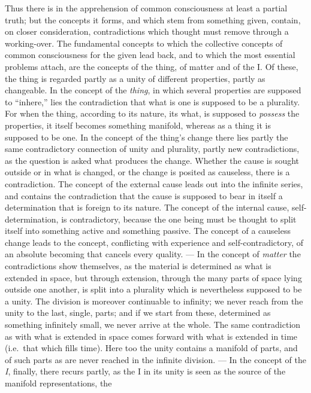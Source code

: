 Thus there is in the apprehension of common consciousness at least a
partial truth; but the concepts it forms, and which stem from something
given, contain, on closer consideration, contradictions which thought
must remove through a working-over. The fundamental concepts to which
the collective concepts of common consciousness for the given lead back,
and to which the most essential problems attach, are the concepts of the
thing, of matter and of the I. Of these, the thing is regarded
partly as a unity of different properties, partly as
changeable. In the concept of the \emph{thing}, in which several
properties are supposed to ``inhere,'' lies the contradiction that what
is one is supposed to be a plurality. For when the thing, according to
its nature, its what, is supposed to \emph{possess} the properties, it
itself becomes something manifold, whereas as a thing it is supposed to
be one. In the concept of the thing's change there lies partly the same
contradictory connection of unity and plurality, partly new
contradictions, as the question is asked what produces the change.
Whether the cause is sought outside or in what is changed, or the change
is posited as causeless, there is a contradiction. The concept of the
external cause leads out into the infinite series, and contains the
contradiction that the cause is supposed to bear in itself a
determination that is foreign to its nature. The concept of the internal
cause, self-determination, is contradictory, because the one being must
be thought to split itself into something active and something passive.
The concept of a causeless change leads to the concept, conflicting with
experience and self-contradictory, of an absolute becoming that cancels
every quality. --- In the concept of \emph{matter} the contradictions
show themselves, as the material is determined as what is extended in
space, but through extension, through the many parts of space lying
outside one another, is split into a plurality which is nevertheless
supposed to be a unity. The division is moreover continuable to
infinity; we never reach from the unity to the last, single, parts; and
if we start from these, determined as something infinitely small, we
never arrive at the whole. The same contradiction as with what is
extended in space comes forward with what is extended in time (i.e.\
that which fills time). Here too the unity contains a manifold of parts,
and of such parts as are never reached in the infinite division. --- In
the concept of the \emph{I}, finally, there recurs partly, as the I in
its unity is seen as the source of the manifold representations, the
